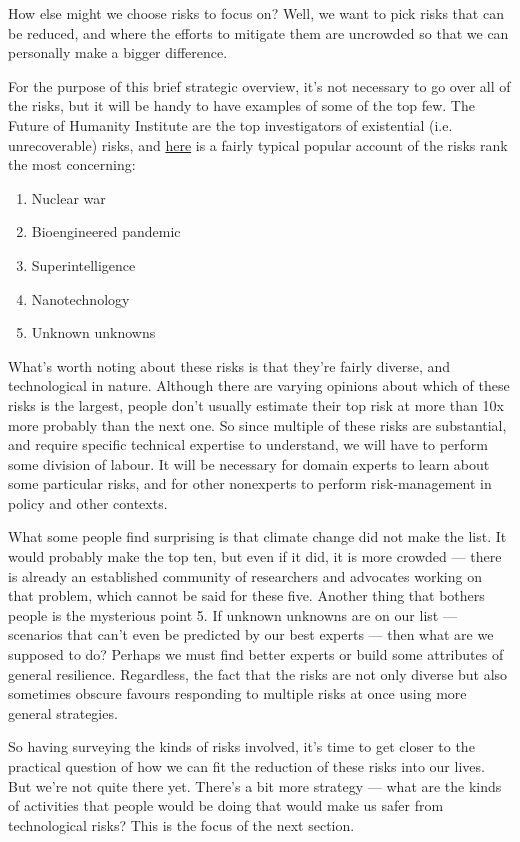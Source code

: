 ﻿\documentclass[12pt]{article}
\begin{document}
How else might we choose risks to focus on? Well, we want to pick risks that can be reduced, and where 
the efforts to mitigate them are uncrowded so that we can personally make a bigger difference.

For the purpose of this brief strategic overview, it's not necessary to go over all of the risks, 
but it will be handy to have examples of some of the top few. The Future of Humanity Institute are 
the top investigators of existential (i.e. unrecoverable) risks, and 
\href{https://theconversation.com/the-five-biggest-threats-to-human-existence-27053}{here} is a fairly typical popular 
account of the risks rank the most concerning:
\begin{enumerate}
    \item Nuclear war
    \item Bioengineered pandemic
    \item Superintelligence
    \item Nanotechnology
    \item Unknown unknowns
\end{enumerate}

What's worth noting about these risks is that they're fairly diverse, and technological in nature. 
Although there are varying opinions about which of these risks is the largest, people don't usually 
estimate their top risk at more than 10x more probably than the next one. So since multiple of these 
risks are substantial, and require specific technical expertise to understand, we will have to perform 
some division of labour. It will be necessary for domain experts to learn about some particular risks, 
and for other nonexperts to perform risk-management in policy and other contexts.

What some people find surprising is that climate change did not make the list. It would probably make the top ten, 
but even if it did, it is more crowded --- there is already an established community of researchers and advocates 
working on that problem, which cannot be said for these five. Another thing that bothers people is the mysterious 
point 5. If unknown unknowns are on our list --- scenarios that can't even be predicted by our best experts --- then 
what are we supposed to do? Perhaps we must find better experts or build some attributes of general resilience. 
Regardless, the fact that the risks are not only diverse but also sometimes obscure favours responding to multiple 
risks at once using more general strategies.

So having surveying the kinds of risks involved, it's time to get closer to the practical question of how we can 
fit the reduction of these risks into our lives. But we're not quite there yet. There's a bit more strategy --- 
what are the kinds of activities that people would be doing that would make us safer from technological risks? 
This is the focus of the next section.
\end{document}
